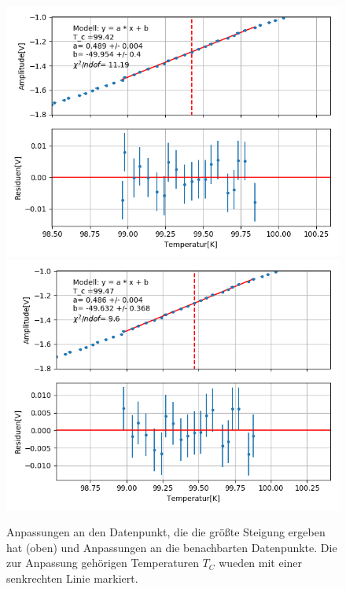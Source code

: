 \documentclass[12pt,a4paper]{article}
\begin{document}
\begin{figure}
\includegraphics[scale=0.5]{Bilder/Haupt_Supra/X1_Steigung4.png}
\includegraphics[scale=0.5]{Bilder/Haupt_Supra/X1_Steigung5.png}

\caption{Anpassungen an den Datenpunkt, die die größte Steigung ergeben hat (oben) und Anpassungen an die benachbarten Datenpunkte. Die zur Anpassung gehörigen Temperaturen $T_C$ wueden mit einer senkrechten Linie markiert.}
\label{fig:Supra_X1anpass}
\end{figure}
\end{document}
